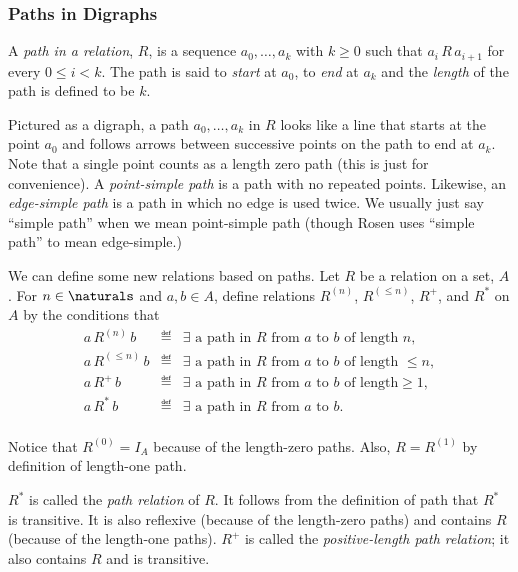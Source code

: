 \subsubsection{Paths in Digraphs}\label{paths}

\begin{definition}
A \emph{path in a relation}, $R$, is a sequence $a_0,\dots,a_k$ with $k \ge
0$ such that $a_i\, R\, a_{i+1}$ for every $0 \le i < k$.  The path is
said to \emph{start} at $a_0$, to \emph{end} at $a_k$ and the
\emph{length} of the path is defined to be $k$.
\end{definition}

Pictured as a digraph, a path $a_0,\dots,a_k$ in $R$ looks like a line
that starts at the point $a_0$ and follows arrows between successive
points on the path to end at $a_k$.  Note that a single point counts as a
length zero path (this is just for convenience).  A \emph{point-simple
path} is a path with no repeated points.  Likewise, an \emph{edge-simple
path} is a path in which no edge is used twice.  We usually just say
``simple path'' when we mean point-simple path (though Rosen uses ``simple
path'' to mean edge-simple.)

We can define some new relations based on paths.  Let $R$ be a relation on
a set, $A$.  For $n \in \naturals$ and $a,b \in A$, define relations
$R^{(n)}$, $R^{(\le n)}$, $R^+$, and $R^*$ on $A$ by the conditions that
\begin{eqnarray*}
a\, R^{(n)}\, b &\eqdef& \exists\mbox{ a path in $R$ from $a$ to $b$ of length $n$},\\
a\, R^{(\le n)}\, b &\eqdef& \exists\mbox{ a path in $R$ from $a$ to $b$ of
length $\le n$},\\
a\, R^+\, b &\eqdef& \exists\mbox{ a path in $R$ from $a$ to $b$ of length
$\ge 1$},\\
a\, R^*\, b &\eqdef& \exists\mbox{ a path in $R$ from $a$ to $b$}.\\
\end{eqnarray*}

Notice that $R^{(0)} = I_A$ because of the length-zero paths.  Also, $R =
R^{(1)}$ by definition of length-one path.

$R^*$ is called the \emph{path relation} of $R$.  It follows from the
definition of path that $R^*$ is transitive.  It is also reflexive (because
of the length-zero paths) and contains $R$ (because of the length-one
paths).  $R^+$ is called the \emph{positive-length path relation}; it also
contains $R$ and is transitive.


